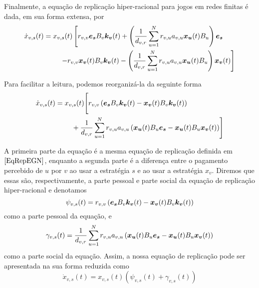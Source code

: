 Finalmente, a equação de replicação hiper-racional para jogos em redes finitas é dada, em sua forma extensa, por
\begin{equation}
    \label{defEqRepHR}
    \Dot{x}_{v,s}(t)= \!\begin{multlined}[t]
        x_{v,s}(t)\left[r_{v,v}\BS{e_s} B_v \BS{k_v}(t)+ \left(\frac{1}{d_{v,r}}\sum_{u=1}^Nr_{v,u}a_{v,u} \BS{x_u}(t)B_u\right)\BS{e_s} \right. \\
        \left. -r_{v,v}\BS{x_v}(t) B_v \BS{k_v}(t) -\left(\frac{1}{d_{v,r}}\sum_{u=1}^N r_{v,u}a_{v,u}\BS{x_u}(t)B_u\right) \BS{x_v}(t)\right]
    \end{multlined}
\end{equation}

Para facilitar a leitura, podemos reorganizá-la da seguinte forma
\begin{equation}
    \Dot{x}_{v,s}(t)= \!\begin{multlined}[t]
        x_{v,s}(t)\Biggl[ r_{v,v}\left(\BS{e_s} B_v \BS{k_v}(t)-\BS{x_v}(t) B_v \BS{k_v}(t)\right) \\
        +\frac{1}{d_{v,r}}\sum_{u=1}^N r_{v,u}a_{v,u}
        \left(\BS{x_u}(t) B_u \BS{e_s}-\BS{x_u}(t) B_u \BS{x_v}(t)\right)\Biggr]
    \end{multlined}
\end{equation}

A primeira parte da equação é a mesma equação de replicação definida em $\eqref{EqRepEGN}$, enquanto a segunda parte é a diferença entre o pagamento percebido de $u$ por $v$ ao usar a estratégia $s$ e ao usar a estratégia $x_v$. Diremos que essas são, respectivamente, a parte pessoal e parte social da equação de replicação hiper-racional e denotamos
\begin{equation}
    \psi_{v,s}(t)=r_{v,v}\left(\boldsymbol{e_s} B_v \boldsymbol{k_v}(t)-\boldsymbol{x_v}(t) B_v \boldsymbol{k_v}(t)\right)
\end{equation}
como a parte pessoal da equação, e
\begin{equation}
    \gamma_{v,s}(t)=\frac{1}{d_{v,r}}\sum_{u=1}^N r_{v,u}a_{v,u}
                    \left(\boldsymbol{x_u}(t) B_u \boldsymbol{e_s}-\boldsymbol{x_u}(t) B_u \boldsymbol{x_v}(t)\right)
\end{equation}
como a parte social da equação. Assim, a nossa equação de replicação pode ser apresentada na sua forma reduzida como
\begin{equation}
    \label{EqReduzida}
    \Dot{x}_{v,s}(t)=x_{v,s}(t)\left(\psi_{v,s}(t)+\gamma_{v,s}(t)\right)
\end{equation}


